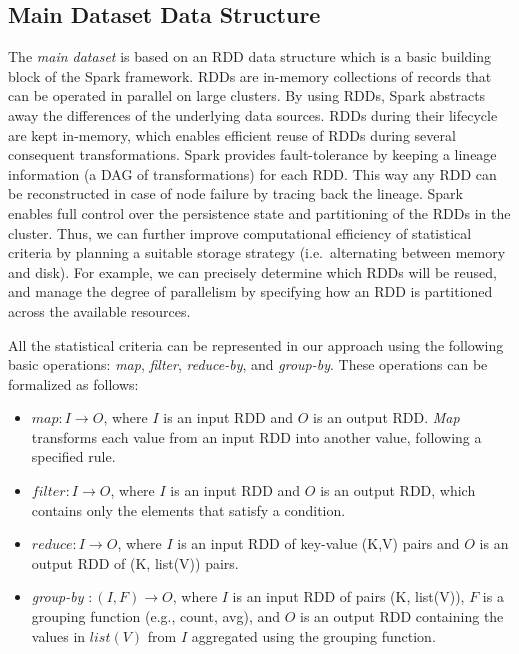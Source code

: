 \subsection{Main Dataset Data Structure}

The \emph{main dataset} is based on an \gls{RDD} data structure which is a basic building block of the Spark framework.
\gls{RDD}s are in-memory collections of records that can be operated in parallel on large clusters.
By using \gls{RDD}s, Spark abstracts away the differences of the underlying data sources.
\gls{RDD}s during their lifecycle are kept in-memory, which enables efficient reuse of \gls{RDD}s during several consequent transformations.
Spark provides fault-tolerance by keeping a lineage information (a \gls{DAG} of transformations) for each \gls{RDD}.
This way any \gls{RDD} can be reconstructed in case of node failure by tracing back the lineage.
Spark enables full control over the persistence state and partitioning of the \gls{RDD}s in the cluster.
Thus, we can further improve computational efficiency of statistical criteria by planning a suitable storage strategy (i.e.~alternating between memory and disk).
For example, we can precisely determine which RDDs will be reused, and manage the degree of parallelism by specifying how an \gls{RDD} is partitioned across the available resources.

\begin{definition}
\label{def:basicdefination}
All the statistical criteria can be represented in our approach using the following basic operations: \textit{map}, \textit{filter}, \textit{reduce-by}, and \textit{group-by}.
These operations can be formalized as follows:
\begin{itemize}
    \item $map: I \rightarrow O$, where $I$ is an input \gls{RDD} and $O$ is an output \gls{RDD}. \textit{Map} transforms each value from an input RDD into another value, following a specified rule. %
    \item $filter: I \rightarrow O$, where $I$ is an input \gls{RDD} and $O$ is an output \gls{RDD}, which contains only the elements that satisfy a condition. 
    \item $reduce: I \rightarrow O$, where $I$ is an input \gls{RDD} of key-value (K,V) pairs and $O$ is an output \gls{RDD} of (K, list(V)) pairs.
    
    \item \textit{group-by} $: (I, F) \rightarrow O$, where $I$ is an input \gls{RDD} of pairs (K, list(V)), $F$ is a grouping function (e.g., count, avg), and $O$ is an output \gls{RDD} containing the values in $list(V)$ from $I$ aggregated using the grouping function.
    
\end{itemize}
\end{definition}


